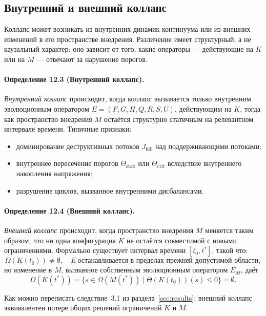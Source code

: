 \subsection{Внутренний и внешний коллапс}

Коллапс может возникать из внутренних динамик континуума или из внешних
изменений в его пространстве внедрения. Различение имеет структурный, а не
каузальный характер: оно зависит от того, какие операторы — действующие на \(K\)
или на \(M\) — отвечают за нарушение порогов.

\paragraph{Определение 12.3 (Внутренний коллапс).}
\emph{Внутренний коллапс} происходит, когда коллапс вызывается только
внутренним эволюционным оператором \(E=(F,G,H,Q,R,S,U)\), действующим на
\(K\), тогда как пространство внедрения \(M\) остаётся структурно
статичным на релевантном интервале времени. Типичные признаки:
\begin{itemize}
  \item доминирование деструктивных потоков \(J_{\mathrm{kill}}\) над
        поддерживающими потоками;
  \item внутреннее пересечение порогов \(\Theta_{\mathrm{stab}}\) или
        \(\Theta_{\mathrm{crit}}\) вследствие внутреннего накопления
        напряжения;
  \item разрушение циклов, вызванное внутренними дисбалансами.
\end{itemize}

\paragraph{Определение 12.4 (Внешний коллапс).}
\emph{Внешний коллапс} происходит, когда пространство внедрения \(M\)
меняется таким образом, что ни одна конфигурация \(K\) не остаётся совместимой
с новыми ограничениями. Формально существует интервал времени
\([t_0,t^{\ast}]\), такой что:
\[
  \Omega(K(t_0))\neq\emptyset,
  \quad
  E\ \text{останавливается в пределах прежней допустимой области},
\]
но изменение в \(M\), вызванное собственным эволюционным оператором \(E_M\),
даёт
\[
  \Omega(K(t^{\ast})) =
    \big\{ s \in \Omega(M(t^{\ast})) \mid
           \Theta(K(t_0))(s)\le 0 \big\} = \emptyset.
\]

Как можно переписать следствие~3.1 из раздела~\ref{sec:results}:
внешний коллапс эквивалентен потере общих решений ограничений \(K\) и \(M\).

